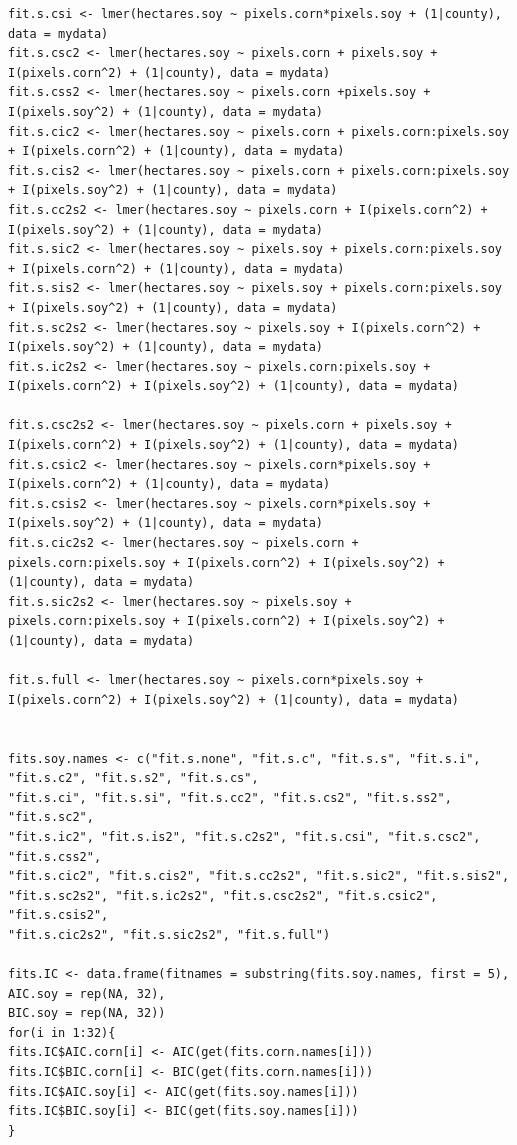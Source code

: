 \documentclass{article}
\begin{document}
\begin{Verbatim}[fontsize=\tiny]
fit.s.csi <- lmer(hectares.soy ~ pixels.corn*pixels.soy + (1|county), data = mydata)
fit.s.csc2 <- lmer(hectares.soy ~ pixels.corn + pixels.soy + I(pixels.corn^2) + (1|county), data = mydata)
fit.s.css2 <- lmer(hectares.soy ~ pixels.corn +pixels.soy + I(pixels.soy^2) + (1|county), data = mydata)
fit.s.cic2 <- lmer(hectares.soy ~ pixels.corn + pixels.corn:pixels.soy + I(pixels.corn^2) + (1|county), data = mydata)
fit.s.cis2 <- lmer(hectares.soy ~ pixels.corn + pixels.corn:pixels.soy + I(pixels.soy^2) + (1|county), data = mydata)
fit.s.cc2s2 <- lmer(hectares.soy ~ pixels.corn + I(pixels.corn^2) + I(pixels.soy^2) + (1|county), data = mydata)
fit.s.sic2 <- lmer(hectares.soy ~ pixels.soy + pixels.corn:pixels.soy + I(pixels.corn^2) + (1|county), data = mydata)
fit.s.sis2 <- lmer(hectares.soy ~ pixels.soy + pixels.corn:pixels.soy + I(pixels.soy^2) + (1|county), data = mydata)
fit.s.sc2s2 <- lmer(hectares.soy ~ pixels.soy + I(pixels.corn^2) + I(pixels.soy^2) + (1|county), data = mydata)
fit.s.ic2s2 <- lmer(hectares.soy ~ pixels.corn:pixels.soy + I(pixels.corn^2) + I(pixels.soy^2) + (1|county), data = mydata)

fit.s.csc2s2 <- lmer(hectares.soy ~ pixels.corn + pixels.soy + I(pixels.corn^2) + I(pixels.soy^2) + (1|county), data = mydata)
fit.s.csic2 <- lmer(hectares.soy ~ pixels.corn*pixels.soy + I(pixels.corn^2) + (1|county), data = mydata)
fit.s.csis2 <- lmer(hectares.soy ~ pixels.corn*pixels.soy + I(pixels.soy^2) + (1|county), data = mydata)
fit.s.cic2s2 <- lmer(hectares.soy ~ pixels.corn + pixels.corn:pixels.soy + I(pixels.corn^2) + I(pixels.soy^2) + (1|county), data = mydata)
fit.s.sic2s2 <- lmer(hectares.soy ~ pixels.soy + pixels.corn:pixels.soy + I(pixels.corn^2) + I(pixels.soy^2) + (1|county), data = mydata)

fit.s.full <- lmer(hectares.soy ~ pixels.corn*pixels.soy + I(pixels.corn^2) + I(pixels.soy^2) + (1|county), data = mydata)


fits.soy.names <- c("fit.s.none", "fit.s.c", "fit.s.s", "fit.s.i", "fit.s.c2", "fit.s.s2", "fit.s.cs",
"fit.s.ci", "fit.s.si", "fit.s.cc2", "fit.s.cs2", "fit.s.ss2", "fit.s.sc2",
"fit.s.ic2", "fit.s.is2", "fit.s.c2s2", "fit.s.csi", "fit.s.csc2", "fit.s.css2",
"fit.s.cic2", "fit.s.cis2", "fit.s.cc2s2", "fit.s.sic2", "fit.s.sis2",
"fit.s.sc2s2", "fit.s.ic2s2", "fit.s.csc2s2", "fit.s.csic2", "fit.s.csis2",
"fit.s.cic2s2", "fit.s.sic2s2", "fit.s.full")

fits.IC <- data.frame(fitnames = substring(fits.soy.names, first = 5),
AIC.soy = rep(NA, 32),
BIC.soy = rep(NA, 32))
for(i in 1:32){
fits.IC$AIC.corn[i] <- AIC(get(fits.corn.names[i]))
fits.IC$BIC.corn[i] <- BIC(get(fits.corn.names[i]))
fits.IC$AIC.soy[i] <- AIC(get(fits.soy.names[i]))
fits.IC$BIC.soy[i] <- BIC(get(fits.soy.names[i]))
}


\end{Verbatim}
\end{document}
